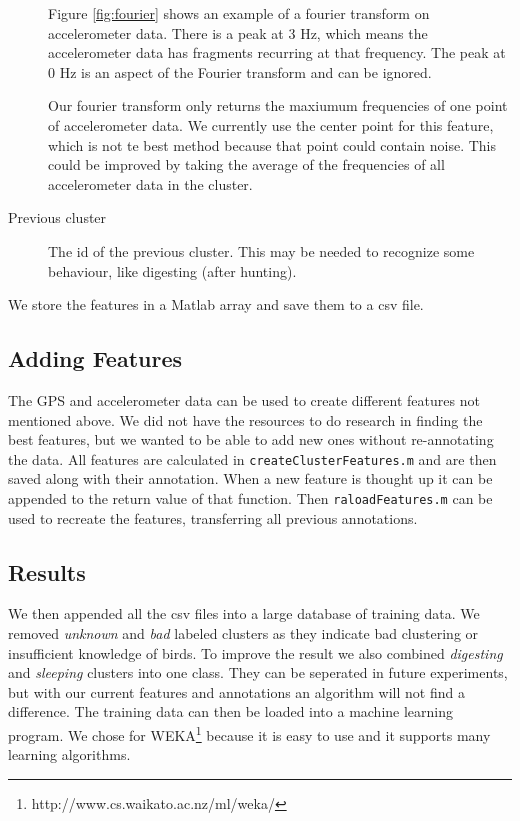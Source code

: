 \begin{description}
  Figure \ref{fig:fourier} shows an example of a fourier transform on accelerometer data. There is a peak at 3 Hz, which means the accelerometer data has fragments recurring at that frequency. The peak at 0 Hz is an aspect of the Fourier transform and can be ignored. 

  Our fourier transform only returns the maxiumum frequencies of one point of accelerometer data. We currently use the center point for this feature, which is not te best method because that point could contain noise. This could be improved by taking the average of the frequencies of all accelerometer data in the cluster.
  \item[Previous cluster] The id of the previous cluster. This may be needed to recognize some behaviour, like digesting (after hunting).
 \end{description}

 We store the features in a Matlab array and save them to a csv file.

\subsection{Adding Features}
The GPS and accelerometer data can be used to create different features not mentioned above. We did not have the resources to do research in finding the best features, but we wanted to be able to add new ones without re-annotating the data. All features are calculated in \verb|createClusterFeatures.m| and are then saved along with their annotation. When a new feature is thought up it can be appended to the return value of that function. Then \verb|raloadFeatures.m| can be used to recreate the features, transferring all previous annotations. 

 \subsection{Results}
 We then appended all the csv files into a large database of training data. We removed \emph{unknown} and \emph{bad} labeled clusters as they indicate bad clustering or insufficient knowledge of birds. To improve the result we also combined \emph{digesting} and \emph{sleeping} clusters into one class. They can be seperated in future experiments, but with our current features and annotations an algorithm will not find a difference. The training data can then be loaded into a machine learning program. We chose for WEKA\footnote{http://www.cs.waikato.ac.nz/ml/weka/} because it is easy to use and it supports many learning algorithms.

